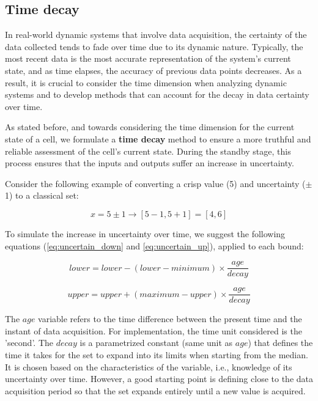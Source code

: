 \subsection{Time decay} \label{subsec:timedecay}

In real-world dynamic systems that involve data acquisition, the certainty of the data collected tends to fade over time due to its dynamic nature. Typically, the most recent data is the most accurate representation of the system's current state, and as time elapses, the accuracy of previous data points decreases. As a result, it is crucial to consider the time dimension when analyzing dynamic systems and to develop methods that can account for the decay in data certainty over time.

As stated before, and towards considering the time dimension for the current state of a cell, we formulate a \textbf{time decay} method to ensure a more truthful and reliable assessment of the cell's current state. During the standby stage, this process ensures that the inputs and outputs suffer an increase in uncertainty.

Consider the following example of converting a crisp value (5) and uncertainty ($\pm$1) to a classical set:

$$x = 5 \pm 1 \rightarrow [5-1, 5+1] = [4, 6]$$

To simulate the increase in uncertainty over time, we suggest the following equations (\ref{eq:uncertain_down} and \ref{eq:uncertain_up}), applied to each bound:

\begin{equation} \label{eq:uncertain_down}
lower = lower - (lower - minimum) \times \frac{age}{decay}
\end{equation}

\begin{equation} \label{eq:uncertain_up}
upper = upper + (maximum - upper) \times \frac{age}{decay}
\end{equation}

The $age$ variable refers to the time difference between the present time and the instant of data acquisition. For implementation, the time unit considered is the 'second'. The $decay$ is a parametrized constant (same unit as $age$) that defines the time it takes for the set to expand into its limits when starting from the median. It is chosen based on the characteristics of the variable, i.e., knowledge of its uncertainty over time. However, a good starting point is defining close to the data acquisition period so that the set expands entirely until a new value is acquired.

